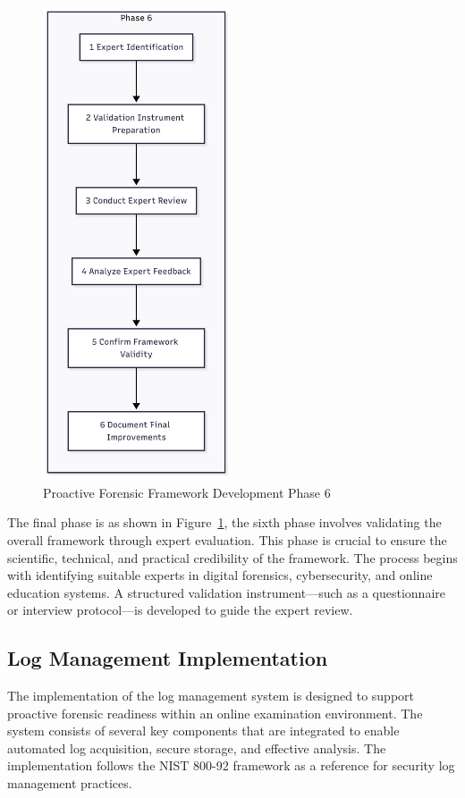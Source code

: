\begin{figure}[H]
    \centering
    \includegraphics[height=14cm]{figure/framework-development-phase-6.png}
    \caption{Proactive Forensic Framework Development Phase 6}
    \label{fig:framework-development-phase-6}
\end{figure}

The final phase is as shown in Figure~\ref{fig:framework-development-phase-6}, the sixth phase involves validating the overall framework through expert evaluation. This phase is crucial to ensure the scientific, technical, and practical credibility of the framework. The process begins with identifying suitable experts in digital forensics, cybersecurity, and online education systems. A structured validation instrument—such as a questionnaire or interview protocol—is developed to guide the expert review.

\subsection{Log Management Implementation}

The implementation of the log management system is designed to support proactive forensic readiness within an online examination environment. The system consists of several key components that are integrated to enable automated log acquisition, secure storage, and effective analysis. The implementation follows the NIST 800-92 framework as a reference for security log management practices.

